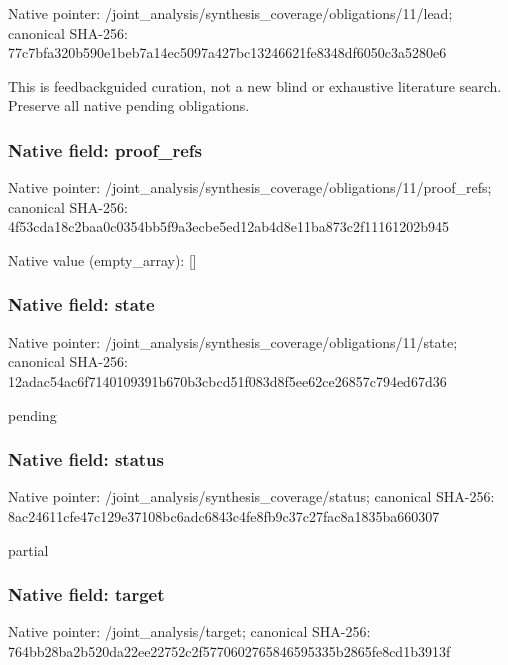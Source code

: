 \documentclass[10pt,a4paper]{article}
\begin{document}
Native pointer: /joint\_analysis/synthesi\allowbreak{}s\_coverage/obligations/1\allowbreak{}1/lead; canonical SHA-256: 77c7bfa320b590e1beb7a14e\allowbreak{}c5097a427bc13246621fe834\allowbreak{}8df6050c3a5280e6


This is feedbackguided curation, not a new blind or exhaustive literature search. Preserve all native pending obligations.


\subsubsection{Native field: proof\_refs}


Native pointer: /joint\_analysis/synthesi\allowbreak{}s\_coverage/obligations/1\allowbreak{}1/proof\_refs; canonical SHA-256: 4f53cda18c2baa0c0354bb5f\allowbreak{}9a3ecbe5ed12ab4d8e11ba87\allowbreak{}3c2f11161202b945



Native value (empty\_array): []



\subsubsection{Native field: state}


Native pointer: /joint\_analysis/synthesi\allowbreak{}s\_coverage/obligations/1\allowbreak{}1/state; canonical SHA-256: 12adac54ac6f7140109391b6\allowbreak{}70b3cbcd51f083d8f5ee62ce\allowbreak{}26857c794ed67d36


pending


\subsubsection{Native field: status}


Native pointer: /joint\_analysis/synthesi\allowbreak{}s\_coverage/status; canonical SHA-256: 8ac24611cfe47c129e37108b\allowbreak{}c6adc6843c4fe8fb9c37c27f\allowbreak{}ac8a1835ba660307


partial


\subsubsection{Native field: target}


Native pointer: /joint\_analysis/target; canonical SHA-256: 764bb28ba2b520da22ee2275\allowbreak{}2c2f5770602765846595335b\allowbreak{}2865fe8cd1b3913f
\end{document}
